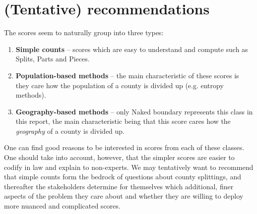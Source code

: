\documentclass{mgggarticle}
\begin{document}
\section{(Tentative) recommendations}
The scores seem to naturally group into three types:
\begin{enumerate}
\item \textbf{Simple counts} -- scores which are easy to understand and compute such as Splits, Parts and Pieces.
\item \textbf{Population-based methods} -- the main characteristic of these scores is they care how the population of a county is divided up (e.g. entropy methods).
\item \textbf{Geography-based methods} -- only Naked boundary represents this class in this report, the main characteristic being that this score cares how the \emph{geography} of a county is divided up.
\end{enumerate}

One can find good reasons to be interested in scores from each of these classes. One should take into account, however, that the simpler scores are easier to codify in law and explain to non-experts. We may tentatively want to recommend that simple counts form the bedrock of questions about county splittings, and thereafter the stakeholders determine for themselves which additional, finer aspects of the problem they care about and whether they are willing to deploy more nuanced and complicated scores.
\end{document}
